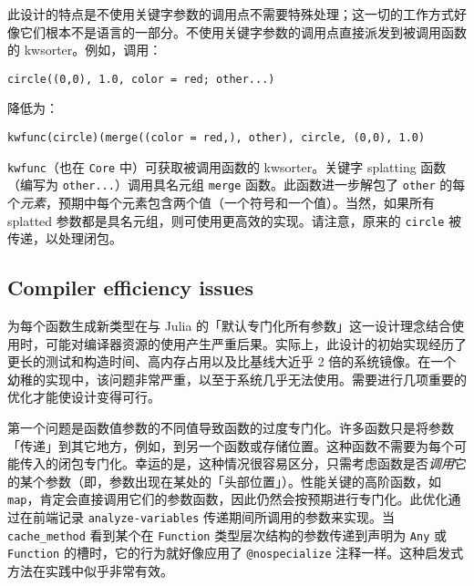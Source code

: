 此设计的特点是不使用关键字参数的调用点不需要特殊处理；这一切的工作方式好像它们根本不是语言的一部分。不使用关键字参数的调用点直接派发到被调用函数的 kwsorter。例如，调用：




\begin{verbatim}
circle((0,0), 1.0, color = red; other...)
\end{verbatim}



降低为：




\begin{verbatim}
kwfunc(circle)(merge((color = red,), other), circle, (0,0), 1.0)
\end{verbatim}



\texttt{kwfunc}（也在 \texttt{Core} 中）可获取被调用函数的 kwsorter。关键字 splatting 函数（编写为 \texttt{other...}）调用具名元组 \texttt{merge} 函数。此函数进一步解包了 \texttt{other} 的每个\emph{元素}，预期中每个元素包含两个值（一个符号和一个值）。当然，如果所有 splatted 参数都是具名元组，则可使用更高效的实现。请注意，原来的 \texttt{circle} 被传递，以处理闭包。



\hypertarget{1871194914272945034}{}


\subsection{Compiler efficiency issues}



为每个函数生成新类型在与 Julia 的「默认专门化所有参数」这一设计理念结合使用时，可能对编译器资源的使用产生严重后果。实际上，此设计的初始实现经历了更长的测试和构造时间、高内存占用以及比基线大近乎 2 倍的系统镜像。在一个幼稚的实现中，该问题非常严重，以至于系统几乎无法使用。需要进行几项重要的优化才能使设计变得可行。



第一个问题是函数值参数的不同值导致函数的过度专门化。许多函数只是将参数「传递」到其它地方，例如，到另一个函数或存储位置。这种函数不需要为每个可能传入的闭包专门化。幸运的是，这种情况很容易区分，只需考虑函数是否\emph{调用}它的某个参数（即，参数出现在某处的「头部位置」）。性能关键的高阶函数，如 \texttt{map}，肯定会直接调用它们的参数函数，因此仍然会按预期进行专门化。此优化通过在前端记录 \texttt{analyze-variables} 传递期间所调用的参数来实现。当 \texttt{cache\_method} 看到某个在 \texttt{Function} 类型层次结构的参数传递到声明为 \texttt{Any} 或 \texttt{Function} 的槽时，它的行为就好像应用了 \texttt{@nospecialize} 注释一样。这种启发式方法在实践中似乎非常有效。



